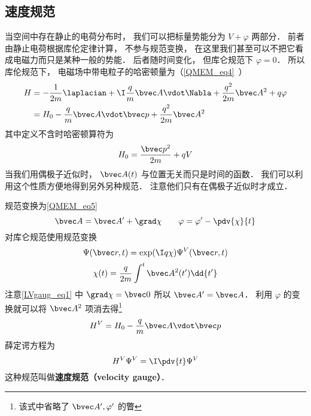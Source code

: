 
\begin{issues}
\issueDraft
\end{issues}


\subsection{速度规范}
当空间中存在静止的电荷分布时， 我们可以把标量势能分为 $V + \varphi$ 两部分． 前者由静止电荷根据库伦定律计算， 不参与规范变换， 在这里我们甚至可以不把它看成电磁力而只是某种一般的势能． 后者随时间变化， 但库仑规范下 $\varphi = 0$． 所以库伦规范下， 电磁场中带电粒子的哈密顿量为（\autoref{QMEM_eq4}~）
\begin{equation}
\begin{aligned}
H &= -\frac{1}{2m} \laplacian + \I \frac{q}{m} \bvec A \vdot \Nabla + \frac{q^2}{2m} \bvec A^2 + q\varphi\\
&= H_0 - \frac{q}{m} \bvec A \vdot \bvec p + \frac{q^2}{2m} \bvec A^2
\end{aligned}
\end{equation}
其中定义不含时哈密顿算符为
\begin{equation}
H_0 = \frac{\bvec p^2}{2m} + qV
\end{equation}
当我们用偶极子近似时， $\bvec A(t)$ 与位置无关而只是时间的函数． 我们可以利用这个性质方便地得到另外另种规范． 注意他们只有在偶极子近似时才成立．

规范变换为\autoref{QMEM_eq5}~
\begin{equation}\label{LVgaug_eq1}
\bvec A = \bvec A' + \grad \chi
\qquad
\varphi = \varphi' - \pdv{\chi}{t}
\end{equation}
对库仑规范使用规范变换
\begin{equation}\label{LVgaug_eq3}
\Psi(\bvec r, t) = \exp(\I q\chi)\Psi^V(\bvec r, t)
\end{equation}
\begin{equation}\label{LVgaug_eq4}
\chi(t) = \frac{q}{2m} \int^t \bvec A^2(t') \dd{t'}
\end{equation}
注意\autoref{LVgaug_eq1} 中 $\grad \chi = \bvec 0$ 所以 $\bvec A' = \bvec A$． 利用 $\varphi$ 的变换就可以将 $\bvec A^2$ 项消去得\footnote{该式中省略了 $\bvec A', \varphi'$ 的瞥}
\begin{equation}
H^V = H_0 - \frac{q}{m} \bvec A \vdot \bvec p
\end{equation}
薛定谔方程为
\begin{equation}
H^V \Psi^V = \I \pdv{t} \Psi^V
\end{equation}
这种规范叫做\textbf{速度规范（velocity gauge）}．

